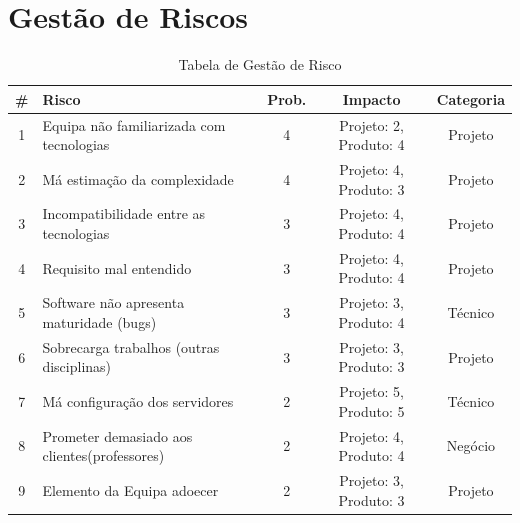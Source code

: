 \documentclass[a4paper]{report}
\begin{document}
\section{Gestão de Riscos}
\label{GR}
\begin{table}[h]
\centering
\begin{tabularx}{\textwidth}{c|X|c|c|c}
\# & Risco & Prob. & Impacto & Categoria \\ \hline
1                        & Equipa não familiarizada com tecnologias                            & 4                          & Projeto: 2, Produto: 4       & Projeto                        \\ \hline
2                        & Má estimação da complexidade                                        & 4                          & Projeto: 4, Produto: 3       & Projeto                        \\ \arrayrulecolor{red}\hline\arrayrulecolor{black}
3                        & Incompatibilidade entre as tecnologias                                 & 3                          & Projeto: 4, Produto: 4       & Projeto                        \\ \hline
4                        & Requisito mal entendido                                             & 3                          & Projeto: 4, Produto: 4       & Projeto                        \\ \hline
5                        & Software não apresenta maturidade (bugs)                            & 3                          & Projeto: 3, Produto: 4       & Técnico                        \\ \hline
6                        & Sobrecarga trabalhos (outras disciplinas)                           & 3                          & Projeto: 3, Produto: 3       & Projeto                        \\ \hline
7                        & Má configuração dos servidores & 2                          & Projeto: 5, Produto: 5       & Técnico                        \\ \hline
8                        & Prometer demasiado aos clientes(professores)                                 & 2                          & Projeto: 4, Produto: 4       & Negócio                        \\ \hline
9                        & Elemento da Equipa adoecer                                          & 2                          & Projeto: 3, Produto: 3       & Projeto   
\end{tabularx}
\caption{Tabela de Gestão de Risco}
\label{TabGR}
\end{table}
\end{document}
